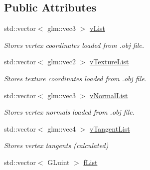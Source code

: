 \subsection*{Public Attributes}
\begin{DoxyCompactItemize}
\item 
std\+::vector$<$ glm\+::vec3 $>$ \hyperlink{class_obj_g_p_u_data_a4479fbcb9ab78bd29f74d768d893123f}{v\+List}\hypertarget{class_obj_g_p_u_data_a4479fbcb9ab78bd29f74d768d893123f}{}\label{class_obj_g_p_u_data_a4479fbcb9ab78bd29f74d768d893123f}

\begin{DoxyCompactList}\small\item\em Stores vertex coordinates loaded from .obj file. \end{DoxyCompactList}\item 
std\+::vector$<$ glm\+::vec2 $>$ \hyperlink{class_obj_g_p_u_data_ab39012ed3e485641f2eda7c7f3de2aec}{v\+Texture\+List}\hypertarget{class_obj_g_p_u_data_ab39012ed3e485641f2eda7c7f3de2aec}{}\label{class_obj_g_p_u_data_ab39012ed3e485641f2eda7c7f3de2aec}

\begin{DoxyCompactList}\small\item\em Stores texture coordinates loaded from .obj file. \end{DoxyCompactList}\item 
std\+::vector$<$ glm\+::vec3 $>$ \hyperlink{class_obj_g_p_u_data_adc7cd78dfb5f2d69998fbdde2e77464f}{v\+Normal\+List}\hypertarget{class_obj_g_p_u_data_adc7cd78dfb5f2d69998fbdde2e77464f}{}\label{class_obj_g_p_u_data_adc7cd78dfb5f2d69998fbdde2e77464f}

\begin{DoxyCompactList}\small\item\em Stores vertex normals loaded from .obj file. \end{DoxyCompactList}\item 
std\+::vector$<$ glm\+::vec4 $>$ \hyperlink{class_obj_g_p_u_data_a824d886e27ae2e1da534ce7fc2f76739}{v\+Tangent\+List}\hypertarget{class_obj_g_p_u_data_a824d886e27ae2e1da534ce7fc2f76739}{}\label{class_obj_g_p_u_data_a824d886e27ae2e1da534ce7fc2f76739}

\begin{DoxyCompactList}\small\item\em Stores vertex tangents (calculated) \end{DoxyCompactList}\item 
std\+::vector$<$ G\+Luint $>$ \hyperlink{class_obj_g_p_u_data_a2672a6ddbbc6ed386477662f7970ce5f}{f\+List}\hypertarget{class_obj_g_p_u_data_a2672a6ddbbc6ed386477662f7970ce5f}{}\label{class_obj_g_p_u_data_a2672a6ddbbc6ed386477662f7970ce5f}


\end{DoxyCompactItemize}
